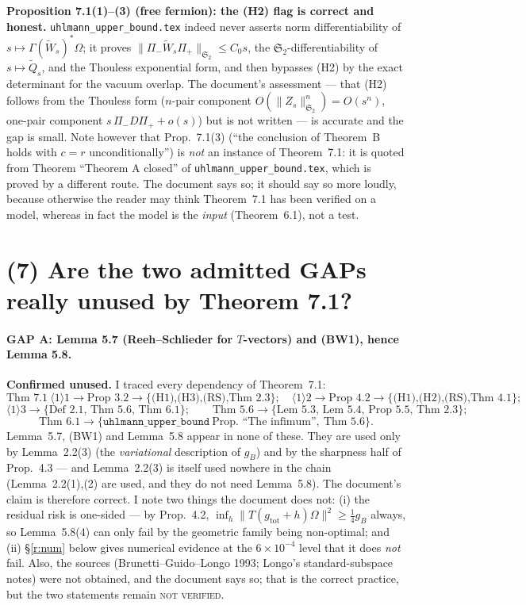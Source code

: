 \documentclass[11pt]{article}
\newcommand{\Wt}{\widetilde W}
\newcommand{\norm}[1]{\lVert#1\rVert}
\newcommand{\gB}{g_B}
\newcommand{\Stwo}{\mathfrak S_2}
\newcommand{\Om}{\Omega}
\newcommand{\gtot}{g_{\mathrm{tot}}}
\begin{document}
\begin{verdictgap}
\textbf{Proposition 7.1(1)--(3) (free fermion): the (H2) flag is correct and honest.}
\texttt{uhlmann\_upper\_bound.tex} indeed never asserts norm differentiability of
$s\mapsto\Gamma(\Wt_s)^*\Om$; it proves $\norm{\Pi_-\Wt_s\Pi_+}_{\Stwo}\le C_0s$, the $\Stwo$-differentia\-bility
of $s\mapsto\widetilde Q_s$, and the Thouless exponential form, and then bypasses (H2) by the exact
determinant for the vacuum overlap.  The document's assessment --- that (H2) follows from the Thouless form
($n$-pair component $O(\norm{Z_s}_{\Stwo}^n)=O(s^n)$, one-pair component $s\,\Pi_-D\Pi_++o(s)$) but is not
written --- is accurate and the gap is small.  Note however that Prop.~7.1(3) (``the conclusion of
Theorem~B holds with $c=r$ unconditionally'') is \emph{not} an instance of Theorem~7.1: it is quoted from
Theorem ``Theorem A closed'' of \texttt{uhlmann\_upper\_bound.tex}, which is proved by a different route.
The document says so; it should say so more loudly, because otherwise the reader may think Theorem~7.1 has
been verified on a model, whereas in fact the model is the \emph{input} (Theorem~6.1), not a test.
\end{verdictgap}

\section{(7) Are the two admitted GAPs really unused by Theorem 7.1?}\label{r:gaps}

\paragraph{GAP A: Lemma 5.7 (Reeh--Schlieder for $T$-vectors) and (BW1), hence Lemma 5.8.}
\textbf{Confirmed unused.}  I traced every dependency of Theorem~7.1:
\[
 \text{Thm 7.1}\ \langle1\rangle1\to\text{Prop 3.2}\to\{\text{(H1),(H3),(RS),Thm 2.3}\};\quad
 \langle1\rangle2\to\text{Prop 4.2}\to\{\text{(H1),(H2),(RS),Thm 4.1}\};
\]
\[
 \langle1\rangle3\to\{\text{Def 2.1, Thm 5.6, Thm 6.1}\};\qquad
 \text{Thm 5.6}\to\{\text{Lem 5.3, Lem 5.4, Prop 5.5, Thm 2.3}\};
\]
\[
 \text{Thm 6.1}\to\{\texttt{uhlmann\_upper\_bound}\ \text{Prop.~``The infimum''},\ \text{Thm 5.6}\}.
\]
Lemma~5.7, (BW1) and Lemma~5.8 appear in none of these.  They are used only by Lemma~2.2(3) (the
\emph{variational} description of $\gB$) and by the sharpness half of Prop.~4.3 --- and Lemma~2.2(3) is
itself used nowhere in the chain (Lemma~2.2(1),(2) are used, and they do not need Lemma~5.8).
The document's claim is therefore correct.  I note two things the document does not:
(i) the residual risk is one-sided --- by Prop.~4.2, $\inf_h\norm{T(\gtot+h)\Om}^2\ge\frac14\gB$ always, so
Lemma~5.8(4) can only fail by the geometric family being non-optimal; and (ii) \S\ref{r:num} below
gives numerical evidence at the $6\times10^{-4}$ level that it does \emph{not} fail.
Also, the sources (Brunetti--Guido--Longo 1993; Longo's standard-subspace notes) were not obtained, and the
document says so; that is the correct practice, but the two statements remain \textsc{not verified}.
\end{document}

